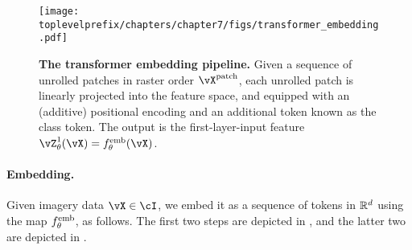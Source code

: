 \documentclass[\toplevelprefix/book-main.tex]{subfiles}
\begin{document}
\begin{figure}
    \centering 
    \texttt{[image: \\toplevelprefix/chapters/chapter7/figs/transformer\_embedding.pdf]}
    \caption{\small\textbf{The transformer embedding pipeline.} Given a sequence of unrolled patches in raster order \(\vX^{\patch}\), each unrolled patch is linearly projected into the feature space, and equipped with an (additive) positional encoding and an additional token known as the class token. The output is the first-layer-input feature \(\vZ_{\theta}^{1}(\vX) = f_{\theta}^{\emb}(\vX)\).}
    \label{fig:transformer_embedding}
\end{figure}

\paragraph{Embedding.} Given imagery data \(\vX \in \cI\), we embed it as a sequence of tokens in \(\mathbb{R}^{d}\) using the map \(f_{\theta}^{\mathrm{emb}}\), as follows. The first two steps are depicted in , and the latter two are depicted in .
\end{document}
